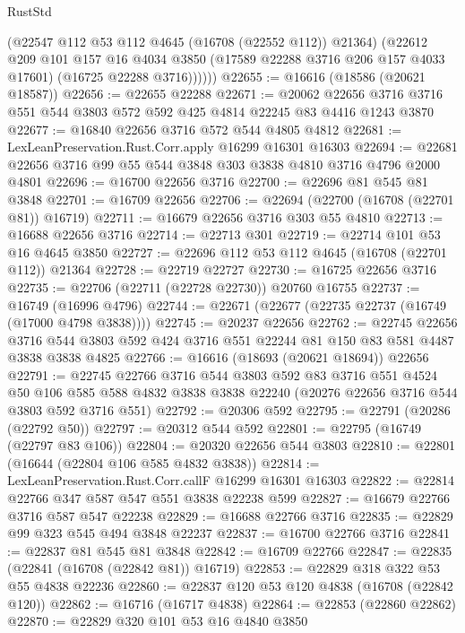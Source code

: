 \begin{lexlean}{RustStd}
\begin{coremodule}
            (@22547 @112 @53 @112 @4645 (@16708 (@22552 @112)) @21364)
            (@22612
              @209
              @101
              @157
              @16
              @4034
              @3850
              (@17589 @22288 @3716 @206 @157 @4033 @17601)
              (@16725 @22288 @3716))))))
@22655 := @16616 (@18586 (@20621 @18587))
@22656 := @22655 @22288
@22671 := @20062
    @22656
    @3716
    @3716
    @551
    @544
    @3803
    @572
    @592
    @425
    @4814
    @22245
    @83
    @4416
    @1243
    @3870
@22677 := @16840 @22656 @3716 @572 @544 @4805 @4812
@22681 := LexLeanPreservation.Rust.Corr.apply @16299 @16301 @16303
@22694 := @22681 @22656 @3716 @99 @55 @544 @3848 @303 @3838 @4810 @3716 @4796 @2000 @4801
@22696 := @16700 @22656 @3716
@22700 := @22696 @81 @545 @81 @3848
@22701 := @16709 @22656
@22706 := @22694 (@22700 (@16708 (@22701 @81)) @16719)
@22711 := @16679 @22656 @3716 @303 @55 @4810
@22713 := @16688 @22656 @3716
@22714 := @22713 @301
@22719 := @22714 @101 @53 @16 @4645 @3850
@22727 := @22696 @112 @53 @112 @4645 (@16708 (@22701 @112)) @21364
@22728 := @22719 @22727
@22730 := @16725 @22656 @3716
@22735 := @22706 (@22711 (@22728 @22730)) @20760 @16755
@22737 := @16749 (@16996 @4796)
@22744 := @22671 (@22677 (@22735 @22737 (@16749 (@17000 @4798 @3838))))
@22745 := @20237 @22656
@22762 := @22745
    @22656
    @3716
    @544
    @3803
    @592
    @424
    @3716
    @551
    @22244
    @81
    @150
    @83
    @581
    @4487
    @3838
    @3838
    @4825
@22766 := @16616 (@18693 (@20621 @18694)) @22656
@22791 := @22745
    @22766
    @3716
    @544
    @3803
    @592
    @83
    @3716
    @551
    @4524
    @50
    @106
    @585
    @588
    @4832
    @3838
    @3838
    @22240
    (@20276 @22656 @3716 @544 @3803 @592 @3716 @551)
@22792 := @20306 @592
@22795 := @22791 (@20286 (@22792 @50))
@22797 := @20312 @544 @592
@22801 := @22795 (@16749 (@22797 @83 @106))
@22804 := @20320 @22656 @544 @3803
@22810 := @22801 (@16644 (@22804 @106 @585 @4832 @3838))
@22814 := LexLeanPreservation.Rust.Corr.callF @16299 @16301 @16303
@22822 := @22814 @22766 @347 @587 @547 @551 @3838 @22238 @599
@22827 := @16679 @22766 @3716 @587 @547 @22238
@22829 := @16688 @22766 @3716
@22835 := @22829 @99 @323 @545 @494 @3848 @22237
@22837 := @16700 @22766 @3716
@22841 := @22837 @81 @545 @81 @3848
@22842 := @16709 @22766
@22847 := @22835 (@22841 (@16708 (@22842 @81)) @16719)
@22853 := @22829 @318 @322 @53 @55 @4838 @22236
@22860 := @22837 @120 @53 @120 @4838 (@16708 (@22842 @120))
@22862 := @16716 (@16717 @4838)
@22864 := @22853 (@22860 @22862)
@22870 := @22829 @320 @101 @53 @16 @4840 @3850

\end{coremodule}
\end{lexlean}
